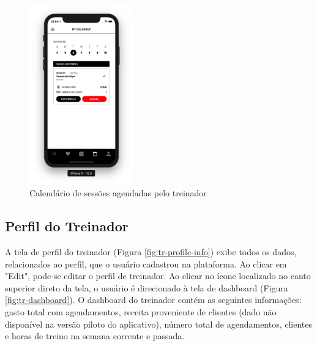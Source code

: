 \begin{figure}[H]
    \centering
    \includegraphics[width=0.4\textwidth]{pfc/figuras/tr-calendar.png}
    \caption{Calendário de sessões agendadas pelo treinador}
    \label{fig:tr-calendar}
\end{figure}

\subsection{Perfil do Treinador}
A tela de perfil do treinador (Figura \ref{fig:tr-profile-info}) exibe todos os dados, relacionados ao perfil, que o usuário cadastrou na plataforma. Ao clicar em "Edit", pode-se editar o perfil de treinador. Ao clicar no ícone localizado no canto superior direto da tela, o usuário é direcionado à tela de dashboard (Figura \ref{fig:tr-dashboard}). O dashboard do treinador contém as seguintes informações: gasto total com agendamentos, receita proveniente de clientes (dado não disponível na versão piloto do aplicativo), número total de agendamentos, clientes e horas de treino na semana corrente e passada.

